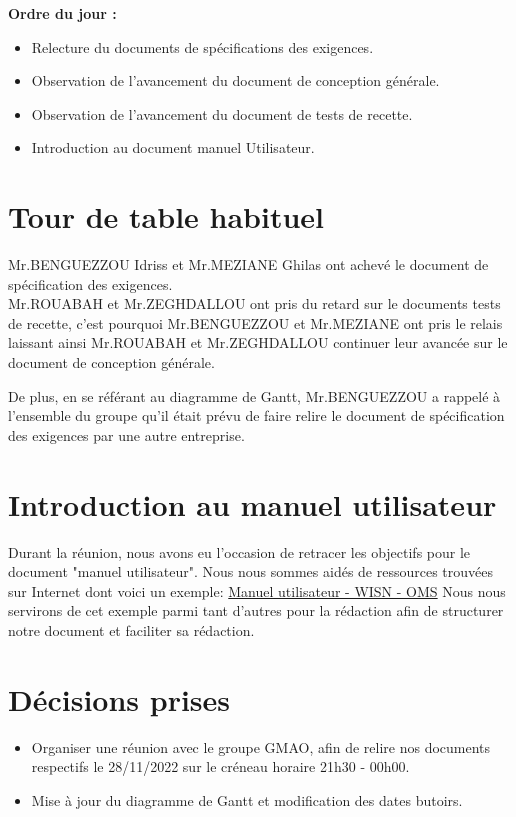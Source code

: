 \documentclass[a4paper, 12pt]{article}
\begin{document}
\textbf{Ordre du jour :}

\begin{itemize}
    \item Relecture du documents de spécifications des exigences.
    \item Observation de l'avancement du document de conception générale.
    \item Observation de l'avancement du document de tests de recette.
    \item Introduction au document manuel Utilisateur.
\end{itemize}

\section{Tour de table habituel}


Mr.BENGUEZZOU Idriss et Mr.MEZIANE Ghilas ont achevé le document de spécification des exigences. \\ 
Mr.ROUABAH et Mr.ZEGHDALLOU ont pris du retard sur le documents tests de recette, c'est pourquoi Mr.BENGUEZZOU et Mr.MEZIANE ont pris le relais laissant ainsi Mr.ROUABAH et Mr.ZEGHDALLOU continuer leur avancée sur le document de conception générale.

De plus, en se référant au diagramme de Gantt, Mr.BENGUEZZOU a rappelé à l'ensemble du groupe qu'il était prévu de faire relire le document de spécification des exigences par une autre entreprise.

\section{Introduction au manuel utilisateur}
Durant la réunion, nous avons eu l'occasion de retracer les objectifs pour le document "manuel utilisateur". Nous nous sommes aidés de ressources trouvées sur Internet dont voici un exemple:
\href{https://apps.who.int/iris/bitstream/handle/10665/205234/9789242500196_software_fre.pdf}{Manuel utilisateur - WISN - OMS}
Nous nous servirons de cet exemple parmi tant d'autres pour la rédaction afin de structurer notre document et faciliter sa rédaction.
\section{Décisions prises}
\begin{itemize}
    \item Organiser une réunion avec le groupe GMAO, afin de relire nos documents respectifs le 28/11/2022 sur le créneau horaire 21h30 - 00h00.
    \item Mise à jour du diagramme de Gantt et modification des dates butoirs.
\end{itemize}
\end{document}
